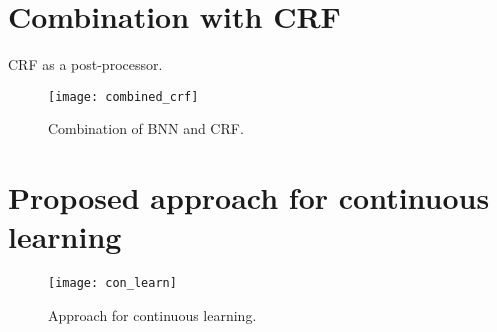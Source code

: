 \section{Combination with CRF}
CRF as a post-processor.
\begin{figure}[H]
	\begin{center}
		\texttt{[image: combined\_crf]}
		\caption{Combination of BNN and CRF.}		
		\label{fig:combined_crf}
	\end{center}
\end{figure}
\section{Proposed approach for continuous learning}

\begin{figure}[H]
	\begin{center}
		\texttt{[image: con\_learn]}
		\caption{Approach for continuous learning.}		
		\label{fig:con_learn}
	\end{center}
\end{figure}
